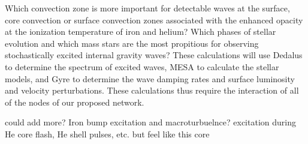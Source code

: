 Which convection zone is more important for detectable waves at the surface, core convection or surface convection zones associated with the enhanced opacity at the ionization temperature of iron and helium? Which phases of stellar evolution and which mass stars are the most propitious for observing stochastically excited internal gravity waves?  These calculations will use Dedalus to determine the spectrum of excited waves, MESA to calculate the stellar models, and Gyre to determine the wave damping rates and surface luminosity and velocity perturbations.  These calculations thus require the interaction of all of the nodes of our proposed network.

could add more?   Iron bump excitation and macroturbuelnce?  excitation during He core flash, He shell pulses, etc.    but feel like this core
